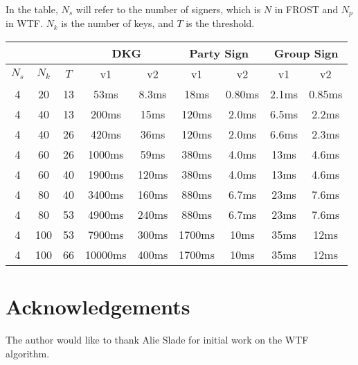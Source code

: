 \documentclass{article}
\begin{document}
In the table, $N_s$ will refer to the number of signers, which is $N$ in FROST and $N_p$ in WTF.  $N_k$ is the number of keys, and $T$ is the threshold.

\begin{center}
  \begin{tabular}{ c|c|c|c|c|c|c|c|c } 
    \multicolumn{3}{c|}{} & \multicolumn{2}{|c|}{DKG}& \multicolumn{2}{|c|}{Party Sign} & \multicolumn{2}{|c}{Group Sign} \\
    \hline
    \hline
    $N_s$ & $N_k$ & $T$ & v1 & v2 & v1 & v2 & v1 & v2 \\ 
    \hline
    \hline
    4 & 20 & 13 & 53ms & 8.3ms & 18ms & 0.80ms & 2.1ms & 0.85ms \\ 
    4 & 40 & 13 & 200ms & 15ms & 120ms & 2.0ms & 6.5ms & 2.2ms \\ 
    4 & 40 & 26 & 420ms & 36ms & 120ms & 2.0ms & 6.6ms & 2.3ms \\ 
    4 & 60 & 26 & 1000ms & 59ms & 380ms & 4.0ms & 13ms & 4.6ms \\ 
    4 & 60 & 40 & 1900ms & 120ms & 380ms & 4.0ms & 13ms & 4.6ms \\ 
    4 & 80 & 40 & 3400ms & 160ms & 880ms & 6.7ms & 23ms & 7.6ms \\ 
    4 & 80 & 53 & 4900ms & 240ms & 880ms & 6.7ms & 23ms & 7.6ms \\ 
    4 & 100 & 53 & 7900ms & 300ms & 1700ms & 10ms & 35ms & 12ms \\ 
    4 & 100 & 66 & 10000ms & 400ms & 1700ms & 10ms & 35ms & 12ms \\ 
  \end{tabular}
\end{center}


\newpage
\onecolumn
\section{
  Acknowledgements
}

The author would like to thank Alie Slade for initial work on the WTF algorithm.
\end{document}
